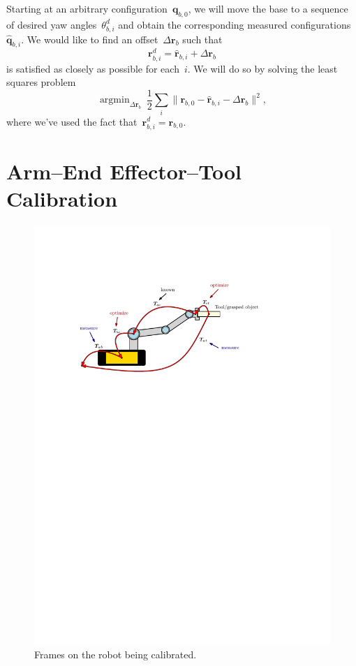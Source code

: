 \documentclass{article}
\DeclareMathOperator*{\argmin}{argmin}
\begin{document}
Starting at an arbitrary configuration~$\bm{q}_{b,0}$, we will move the base to
a sequence of desired yaw angles~$\theta^d_{b,i}$ and obtain the corresponding
measured configurations~$\hat{\bm{q}}_{b,i}$. We would like to find an
offset~$\Delta\bm{r}_b$ such that
\begin{equation}
  \bm{r}^d_{b,i} = \hat{\bm{r}}_{b,i} + \Delta\bm{r}_b
\end{equation}
is satisfied as closely as possible for each~$i$. We will do so by solving the
least squares problem
\begin{equation}\label{eq:contact_force_formulation}
  \argmin_{\Delta\bm{r}_b}\ \frac{1}{2}\sum_i\|\bm{r}_{b,0} - \hat{\bm{r}}_{b,i} - \Delta\bm{r}_b\|^2,
\end{equation}
where we've used the fact that~$\bm{r}^d_{b,i}=\bm{r}_{b,0}$.

\section{Arm--End Effector--Tool Calibration}

\begin{figure}[h]
  \centering
  \includegraphics[width=1\textwidth]{figures/robot_calibration.pdf}
  \caption{Frames on the robot being calibrated.}
    \label{fig:calibration}
\end{figure}
\end{document}
